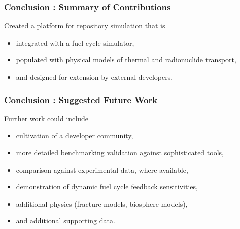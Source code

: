 
\begin{frame}[ctb!]
  \frametitle{Conclusion : Summary of Contributions}
  Created a platform for repository simulation that is
  \begin{itemize}
  \item integrated with a fuel cycle simulator,
  \item populated with physical models of thermal and radionuclide transport,
  \item and designed for extension by external developers.
  \end{itemize}
\end{frame}

\begin{frame}[ctb!]
  \frametitle{Conclusion : Suggested Future Work}
  Further work could include
  \begin{itemize}
  \item cultivation of a developer community,
  \item more detailed benchmarking validation against sophisticated tools,
  \item comparison against experimental data, where available,
  \item demonstration of dynamic fuel cycle feedback sensitivities,
  \item additional physics (fracture models, biosphere models),
  \item and additional supporting data.
  \end{itemize}
\end{frame}

